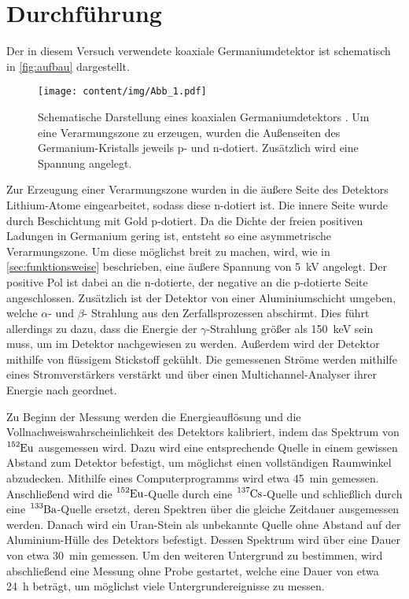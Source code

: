\section{Durchführung}
\label{sec:durchfuehrung}

Der in diesem Versuch verwendete koaxiale Germaniumdetektor ist schematisch in \autoref{fig:aufbau} dargestellt.
\begin{figure}
    \centering
    \texttt{[image: content/img/Abb\_1.pdf]}
    \caption{
        Schematische Darstellung eines koaxialen Germaniumdetektors \cite{versuchsanleitung}.
        Um eine Verarmungszone zu erzeugen,
        wurden die Außenseiten des Germanium-Kristalls jeweils p- und n-dotiert.
        Zusätzlich wird eine Spannung angelegt.
    }
    \label{fig:aufbau}
\end{figure}

Zur Erzeugung einer Verarmungszone wurden in die äußere Seite des Detektors Lithium-Atome eingearbeitet,
sodass diese n-dotiert ist.
Die innere Seite wurde durch Beschichtung mit Gold p-dotiert.
Da die Dichte der freien positiven Ladungen in Germanium gering ist,
entsteht so eine asymmetrische Verarmungszone.
Um diese möglichst breit zu machen,
wird,
wie in \autoref{sec:funktionsweise} beschrieben,
eine äußere Spannung von \SI{5}{\kilo\volt} angelegt.
Der positive Pol ist dabei an die n-dotierte,
der negative an die p-dotierte Seite angeschlossen.
Zusätzlich ist der Detektor von einer Aluminiumschicht umgeben,
welche $\alpha$- und $\beta$- Strahlung aus den Zerfallsprozessen abschirmt.
Dies führt allerdings zu dazu,
dass die Energie der $\gamma$-Strahlung größer als \SI{150}{\kilo\eV} sein muss,
um im Detektor nachgewiesen zu werden.
Außerdem wird der Detektor mithilfe von flüssigem Stickstoff gekühlt.
Die gemessenen Ströme werden mithilfe eines Stromverstärkers verstärkt und über einen Multichannel-Analyser ihrer Energie nach geordnet.

Zu Beginn der Messung werden die Energieauflösung und die Vollnachweiswahrscheinlichkeit des Detektors kalibriert,
indem das Spektrum von $\ce{^152Eu}$ ausgemessen wird.
Dazu wird eine entsprechende Quelle in einem gewissen Abstand zum Detektor befestigt,
um möglichst einen vollständigen Raumwinkel abzudecken.
Mithilfe eines Computerprogramms wird etwa \SI{45}{\minute} gemessen.
Anschließend wird die $\ce{^152Eu}$-Quelle durch eine $\ce{^137Cs}$-Quelle und schließlich durch eine $\ce{^133Ba}$-Quelle ersetzt,
deren Spektren über die gleiche Zeitdauer ausgemessen werden.
Danach wird ein Uran-Stein als unbekannte Quelle ohne Abstand auf der Aluminium-Hülle des Detektors befestigt.
Dessen Spektrum wird über eine Dauer von etwa \SI{30}{\minute} gemessen.
Um den weiteren Untergrund zu bestimmen,
wird abschließend eine Messung ohne Probe gestartet,
welche eine Dauer von etwa \SI{24}{\hour} beträgt,
um möglichst viele Untergrundereignisse zu messen.
